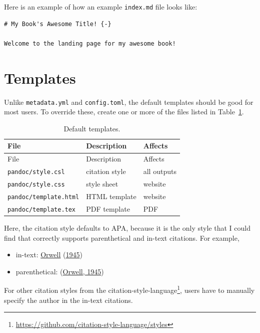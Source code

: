 \documentclass[
  notoc %
]{tufte-book}
\DeclareRobustCommand{\href}[2]{#2\footnote{\url{#1}}}
\providecommand{\tightlist}{%
  \setlength{\itemsep}{0pt}\setlength{\parskip}{0pt}
}
\newcommand{\passthrough}[1]{#1}
\begin{document}
Here is an example of how an example \passthrough{\lstinline!index.md!}
file looks like:

\begin{lstlisting}
# My Book's Awesome Title! {-}

Welcome to the landing page for my awesome book!
\end{lstlisting}

\hypertarget{sec:templates}{%
\section{Templates}\label{sec:templates}}

Unlike \passthrough{\lstinline!metadata.yml!} and
\passthrough{\lstinline!config.toml!}, the default templates should be
good for most users. To override these, create one or more of the files
listed in Table~\ref{tbl:templates}.

\hypertarget{tbl:templates}{}
\begin{longtable}[]{@{}lll@{}}
\caption{\label{tbl:templates}Default templates.}\tabularnewline
\toprule
File & Description & Affects \\
\midrule
\endfirsthead
\toprule
File & Description & Affects \\
\midrule
\endhead
\passthrough{\lstinline!pandoc/style.csl!} & citation style & all
outputs \\
\passthrough{\lstinline!pandoc/style.css!} & style sheet & website \\
\passthrough{\lstinline!pandoc/template.html!} & HTML template &
website \\
\passthrough{\lstinline!pandoc/template.tex!} & PDF template & PDF \\
\bottomrule
\end{longtable}

Here, the citation style defaults to APA, because it is the only style
that I could find that correctly supports parenthetical and in-text
citations. For example,

\begin{itemize}
\tightlist
\item
  in-text: \protect\hyperlink{ref-orwell1945animal}{Orwell}
  (\protect\hyperlink{ref-orwell1945animal}{1945})
\item
  parenthetical: (\protect\hyperlink{ref-orwell1945animal}{Orwell,
  1945})
\end{itemize}

For other citation styles from the
\href{https://github.com/citation-style-language/styles}{citation-style-language},
users have to manually specify the author in the in-text citations.
\end{document}
